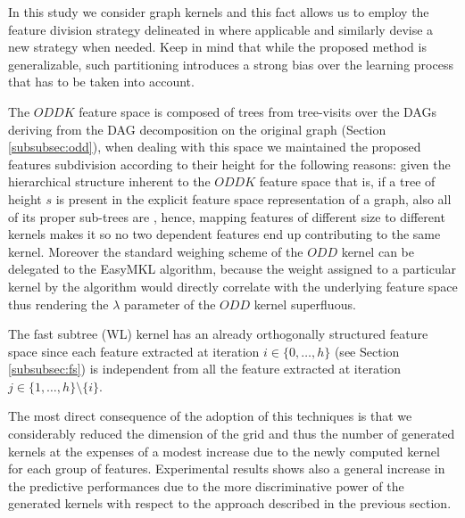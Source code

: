 %

In this study we consider graph kernels and this fact allows us to employ
the feature division strategy delineated in \cite{gmkl} where applicable and similarly
devise a new strategy when needed.
Keep in mind that while the proposed method is generalizable, such partitioning
introduces a strong bias over the learning process that has to be taken into account.

The $ODDK$ feature space is composed of trees from tree-visits
over the DAGs deriving from the DAG decomposition on the original graph (Section \ref{subsubsec:odd}),
when dealing with this space we maintained the proposed features subdivision
according to their height for the following reasons:
given the hierarchical structure inherent to the $ODDK$ feature space that is, if a tree
of height $s$ is present in the explicit feature space representation of a graph,
also all of its proper sub-trees are \cite{gmkl},
hence, mapping features of different size to different kernels makes it so no two
dependent features end up contributing to the same kernel.
Moreover the standard weighing scheme of the $ODD$ kernel can be delegated to
the EasyMKL algorithm, because the weight assigned to a
particular kernel by the algorithm would directly correlate with the underlying
feature space thus rendering the $\lambda$ parameter of the $ODD$ kernel superfluous.

The fast subtree (WL) kernel has an already orthogonally structured feature
space since each feature extracted at iteration $i \in \{0,\dots,h\}$ (see Section \ref{subsubsec:fs})
is independent from all the feature extracted at iteration $j \in \{1,\dots,h\}\setminus \{i\}$.

The most direct consequence of the adoption of this techniques is that we
considerably reduced the dimension of the grid and thus the number of generated kernels at
the expenses of a modest increase due to the newly computed kernel for each group
of features.
Experimental results shows also a general increase in the predictive performances
due to the more discriminative power of the generated kernels with respect
to the approach described in the previous section.


